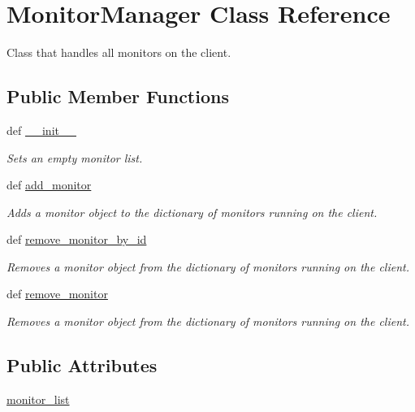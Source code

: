 \hypertarget{classsrc_1_1client_1_1_monitor_manager_1_1_monitor_manager}{\section{Monitor\-Manager Class Reference}
\label{classsrc_1_1client_1_1_monitor_manager_1_1_monitor_manager}
}


Class that handles all monitors on the client.  


\subsection*{Public Member Functions}
\begin{DoxyCompactItemize}
\item 
def \hyperlink{classsrc_1_1client_1_1_monitor_manager_1_1_monitor_manager_ac775ee34451fdfa742b318538164070e}{\-\_\-\-\_\-init\-\_\-\-\_\-}
\begin{DoxyCompactList}\small\item\em Sets an empty monitor list. \end{DoxyCompactList}\item 
def \hyperlink{classsrc_1_1client_1_1_monitor_manager_1_1_monitor_manager_abe39e549c4d37cfd0f5c3ac74a019be5}{add\-\_\-monitor}
\begin{DoxyCompactList}\small\item\em Adds a monitor object to the dictionary of monitors running on the client. \end{DoxyCompactList}\item 
def \hyperlink{classsrc_1_1client_1_1_monitor_manager_1_1_monitor_manager_aff7024b0a548be8e184741e3cb34580f}{remove\-\_\-monitor\-\_\-by\-\_\-id}
\begin{DoxyCompactList}\small\item\em Removes a monitor object from the dictionary of monitors running on the client. \end{DoxyCompactList}\item 
def \hyperlink{classsrc_1_1client_1_1_monitor_manager_1_1_monitor_manager_a7762ac47c82cdf2b48dbf7a773bdaf3a}{remove\-\_\-monitor}
\begin{DoxyCompactList}\small\item\em Removes a monitor object from the dictionary of monitors running on the client. \end{DoxyCompactList}\end{DoxyCompactItemize}
\subsection*{Public Attributes}
\begin{DoxyCompactItemize}
\item 
\hyperlink{classsrc_1_1client_1_1_monitor_manager_1_1_monitor_manager_a2449e01cd15223ed947772d927588390}{monitor\-\_\-list}
\end{DoxyCompactItemize}


